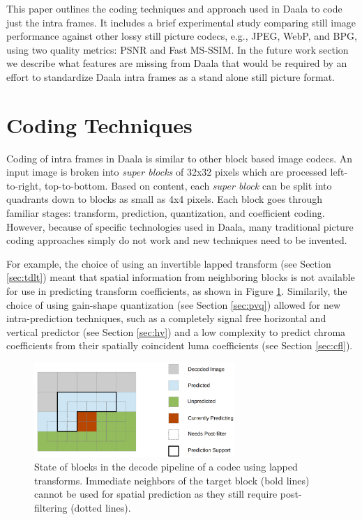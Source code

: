 \documentclass[conference, 10pt]{IEEEtran}
\begin{document}
This paper outlines the coding techniques and approach used in Daala to code
 just the intra frames.
It includes a brief experimental study comparing still image performance
 against other lossy still picture codecs, e.g., JPEG, WebP, and BPG, using
 two quality metrics: PSNR and Fast MS-SSIM.
In the future work section we describe what features are missing from Daala
 that would be required by an effort to standardize Daala intra frames as a
 stand alone still picture format.

\section{Coding Techniques}

Coding of intra frames in Daala is similar to other block based image codecs.
An input image is broken into {\em super blocks} of 32x32 pixels which are
 processed left-to-right, top-to-bottom.
Based on content, each {\em super block} can be split into quadrants down
 to blocks as small as 4x4 pixels.
Each block goes through familiar stages: transform, prediction, quantization,
 and coefficient coding.
However, because of specific technologies used in Daala, many traditional
 picture coding approaches simply do not work and new techniques need to
 be invented.

For example, the choice of using an invertible lapped transform (see Section
 \ref{sec:tdlt}) meant that spatial information from neighboring blocks is not
 available for use in predicting transform coefficients, as shown in Figure
 \ref{fig:decode}.
Similarily, the choice of using gain-shape quantization (see Section \ref{sec:pvq})
 allowed for new intra-prediction techniques, such as a completely signal free
 horizontal and vertical predictor (see Section \ref{sec:hv}) and a low
 complexity to predict chroma coefficients from their spatially coincident
 luma coefficients (see Section \ref{sec:cfl}).

\begin{figure}[h]
\begin{center}
\noindent
  \includegraphics[natwidth=1376,natheight=646,width=3in]{daala_decode.png}
  \caption[example]{\label{fig:decode} State of blocks in the decode pipeline of
   a codec using lapped transforms. Immediate neighbors of the target block
   (bold lines) cannot be used for spatial prediction as they still require
   post-filtering (dotted lines).}
\end{center}
\end{figure}
\end{document}

